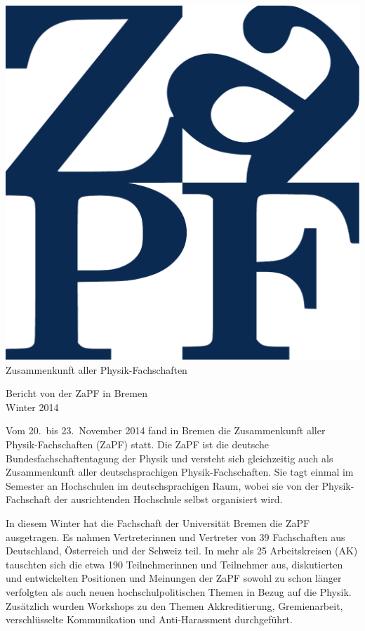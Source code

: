 \documentclass{scrartcl}
\begin{document}
\hspace{0.74\textwidth}
\begin{minipage}{0.25\textwidth}
\vspace{-1cm}
\centering
\includegraphics[width=.89\textwidth]{logo.pdf}
\small Zusammenkunft aller Physik-Fachschaften
\end{minipage}

\begin{center}
\vspace{1.5cm}
\huge{Bericht von der ZaPF in Bremen \\ Winter 2014} 
\vspace{1cm}
\end{center}

Vom  20.\ bis 23.\ November 2014 fand in Bremen die Zusammenkunft aller Physik-Fachschaften (ZaPF) statt. Die ZaPF ist die deutsche  Bundesfachschaftentagung der Physik und versteht sich gleichzeitig auch als Zusammenkunft aller deutschsprachigen Physik-Fachschaften. Sie tagt einmal im Semester an Hochschulen im deutschsprachigen Raum, wobei sie  von der Physik-Fachschaft der ausrichtenden Hochschule selbst  organisiert wird. 

In diesem Winter hat die Fachschaft der Universität Bremen die ZaPF ausgetragen. Es nahmen Vertreterinnen und Vertreter von 39 Fachschaften aus Deutschland, \"Osterreich und der Schweiz teil. In mehr als 25 Arbeitskreisen (AK) tauschten sich die etwa 190 Teilnehmerinnen und Teilnehmer aus, diskutierten und entwickelten Positionen und Meinungen der ZaPF sowohl zu schon l\"anger verfolgten als auch neuen hochschulpolitischen Themen in Bezug auf die Physik. Zus\"atzlich wurden Workshops zu den Themen Akkreditierung, Gremienarbeit, verschl\"usselte Kommunikation und Anti-Harassment durchgef\"uhrt.
\end{document}
